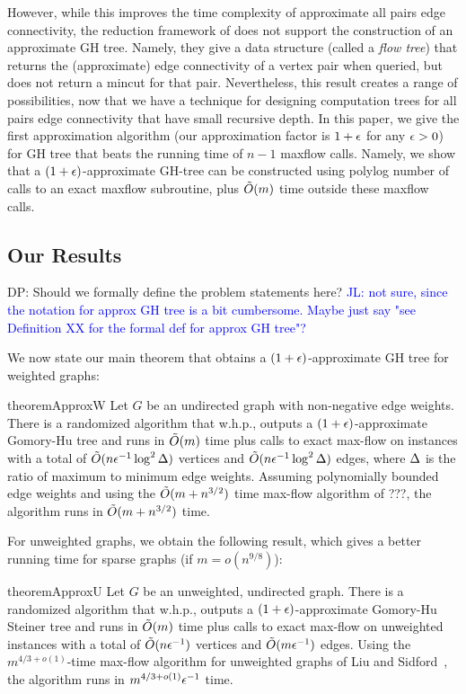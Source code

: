 However, while this improves the time complexity of approximate all pairs edge connectivity, the reduction framework of \cite{AbboudKT20b} does not support the construction of an approximate GH tree. Namely, they give a data structure (called a {\em flow tree}) that returns the (approximate) edge connectivity of a vertex pair when queried, but does not return a mincut for that pair. Nevertheless, this result creates a range of possibilities, now that we have a technique for designing computation trees for all pairs edge connectivity that have small recursive depth. In this paper, we give the first approximation algorithm (our approximation factor is $1+\epsilon$ for any $\epsilon>0$) for GH tree that beats the running time of $n-1$ maxflow calls. Namely, we show that a $(1+\epsilon)$-approximate GH-tree can be constructed using polylog number of calls to an exact maxflow subroutine, plus $\tilde{O}(m)$ time outside these maxflow calls.

\subsection{Our Results}

\alert{DP: Should we formally define the problem statements here?} \textcolor{blue}{JL: not sure, since the notation for approx GH tree is a bit cumbersome. Maybe just say "see Definition XX for the formal def for approx GH tree"?}

We now state our main theorem that obtains a $(1+\epsilon)$-approximate GH tree for weighted graphs:
\begin{restatable}{theorem}{ApproxW}
    Let $G$ be an undirected graph with non-negative edge weights. There is a randomized algorithm that w.h.p., outputs a $(1+\epsilon)$-approximate Gomory-Hu tree and runs in $\tilde{O}(m)$ time plus calls to exact max-flow on instances with a total of $\tilde{O}(n\epsilon^{-1}\log^2\Delta)$ vertices and $\tilde{O}(n\epsilon^{-1}\log^2\Delta)$ edges, where $\Delta$ is the ratio of maximum to minimum edge weights. Assuming polynomially bounded edge weights and using the $\tilde{O}(m+n^{3/2})$ time max-flow algorithm of \alert{???}, the algorithm runs in $\tilde{O}(m+n^{3/2})$ time.
\end{restatable}
For unweighted graphs, we obtain the following result, which gives a better running time for sparse graphs (if $m = o(n^{9/8})$):
\begin{restatable}{theorem}{ApproxU}
Let $G$ be an unweighted, undirected graph. There is a randomized algorithm that w.h.p., outputs a $(1+\epsilon)$-approximate Gomory-Hu Steiner tree and runs in $\tilde{O}(m)$ time plus calls to exact max-flow on unweighted instances with a total of $\tilde{O}(n\epsilon^{-1})$ vertices and $\tilde{O}(m\epsilon^{-1})$ edges. Using the $m^{4/3+o(1)}$-time max-flow algorithm for unweighted graphs of Liu and Sidford~\cite{liu2020faster}, the algorithm runs in $m^{4/3+o(1)}\epsilon^{-1}$ time.
\end{restatable}

